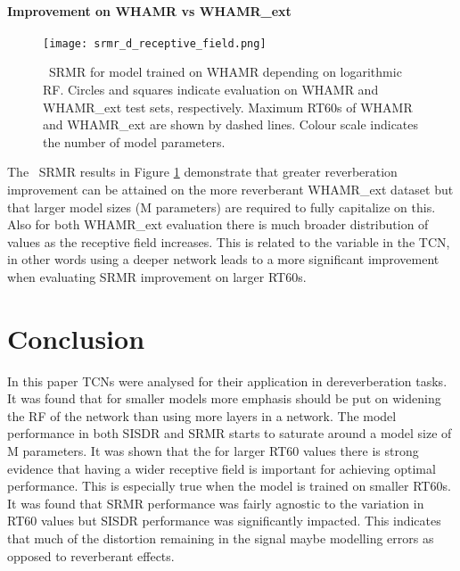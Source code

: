 \documentclass[conference,a4paper]{IEEEtran}
\begin{document}
\paragraph{Improvement on WHAMR vs WHAMR\_ext}
\begin{figure}[h]
    \centering
    \texttt{[image: srmr\_d\_receptive\_field.png]}
    \caption{~SRMR for model trained on WHAMR depending on logarithmic \ac{RF}. Circles and squares indicate evaluation on WHAMR and WHAMR\_ext test sets, respectively. Maximum RT60s of WHAMR and WHAMR\_ext are shown by dashed lines. Colour scale indicates the number of model parameters.}
    \label{fig:srmr_d}
\end{figure}
The ~\ac{SRMR} results in Figure \ref{fig:srmr_d} demonstrate that greater reverberation improvement can be attained on the more reverberant WHAMR\_ext dataset but that larger model sizes (M parameters) are required to fully capitalize on this. Also for both WHAMR\_ext evaluation there is much broader distribution of values as the receptive field increases. This is related to the  variable in the TCN, in other words using a deeper network leads to a more significant improvement when evaluating \ac{SRMR} improvement on larger RT60s.
\section{Conclusion}\label{sec:6}
In this paper \ac{TCN}s were analysed for their application in dereverberation tasks.
It was found that for smaller models more emphasis should be put on widening the \ac{RF} of the network than using more layers in a network.
The model performance in both \ac{SISDR} and \ac{SRMR} starts to saturate around a model size of M parameters. 
It was shown that the for larger RT60 values there is strong evidence that having a wider receptive field is important for achieving optimal performance. This is especially true when the model is trained on smaller RT60s. 
It was found that \ac{SRMR} performance was fairly agnostic to the variation in RT60 values but \ac{SISDR} performance was significantly impacted.
This indicates that much of the distortion remaining in the signal maybe modelling errors as opposed to reverberant effects.


 

\end{document}
